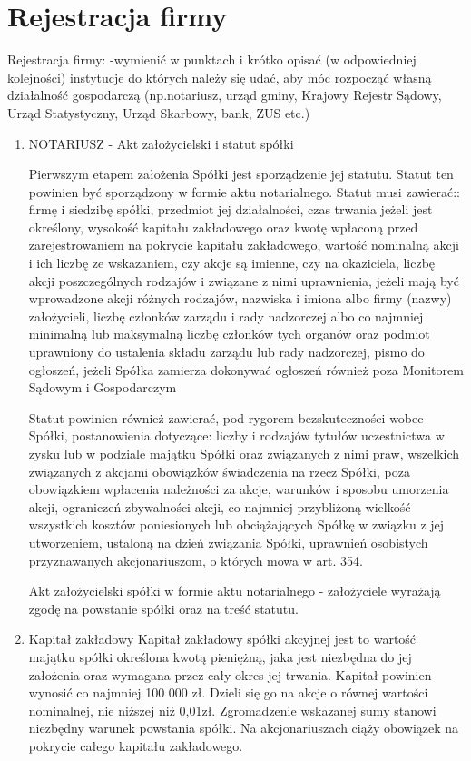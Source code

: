 \documentclass[a4paper, 11pt]{article}
\begin{document}
	
\section{Rejestracja firmy}
Rejestracja firmy:
-wymienić w punktach i krótko opisać (w odpowiedniej kolejności) instytucje do których należy się udać, aby móc rozpocząć własną działalność gospodarczą (np.notariusz, urząd gminy, Krajowy Rejestr Sądowy, Urząd Statystyczny, Urząd Skarbowy, bank, ZUS etc.)
\begin{enumerate}

\item NOTARIUSZ - Akt założycielski i statut spółki

Pierwszym etapem założenia Spółki jest sporządzenie jej statutu. Statut ten powinien być sporządzony w formie aktu notarialnego. Statut musi zawierać::
firmę i siedzibę spółki,
przedmiot jej działalności,
czas trwania jeżeli jest określony,
wysokość kapitału zakładowego oraz kwotę wpłaconą przed zarejestrowaniem na pokrycie kapitału zakładowego,
wartość nominalną akcji i ich liczbę ze wskazaniem, czy akcje są imienne, czy na okaziciela,
liczbę akcji poszczególnych rodzajów i związane z nimi uprawnienia, jeżeli mają być wprowadzone akcji różnych rodzajów,
nazwiska i imiona albo firmy (nazwy) założycieli,
liczbę członków zarządu i rady nadzorczej albo co najmniej minimalną lub maksymalną liczbę członków tych organów oraz podmiot uprawniony do ustalenia składu zarządu lub rady nadzorczej, pismo do ogłoszeń, jeżeli Spółka zamierza dokonywać ogłoszeń również poza Monitorem Sądowym i Gospodarczym

Statut powinien również zawierać, pod rygorem bezskuteczności wobec Spółki, postanowienia dotyczące:
liczby i rodzajów tytułów uczestnictwa w zysku lub w podziale majątku Spółki oraz związanych z nimi praw, wszelkich związanych z akcjami obowiązków świadczenia na rzecz Spółki, poza obowiązkiem wpłacenia należności za akcje,
warunków i sposobu umorzenia akcji,
ograniczeń zbywalności akcji,
co najmniej przybliżoną wielkość wszystkich kosztów poniesionych lub obciążających Spółkę w związku z jej utworzeniem, ustaloną na dzień związania 
Spółki, 
uprawnień osobistych przyznawanych akcjonariuszom, o których mowa w art. 354.


Akt założycielski spółki w formie aktu notarialnego - założyciele wyrażają zgodę na powstanie spółki oraz na treść statutu.
\item Kapitał zakładowy
Kapitał zakładowy spółki akcyjnej jest to wartość majątku spółki określona kwotą pieniężną, jaka jest niezbędna do jej założenia oraz wymagana przez cały okres jej trwania. Kapitał powinien wynosić co najmniej 100 000 zł. Dzieli się go na akcje o równej wartości nominalnej, nie niższej niż 0,01zł. Zgromadzenie wskazanej sumy stanowi niezbędny warunek powstania spółki. Na akcjonariuszach ciąży obowiązek na pokrycie całego kapitału zakładowego.


\end{enumerate}
\end{document}
